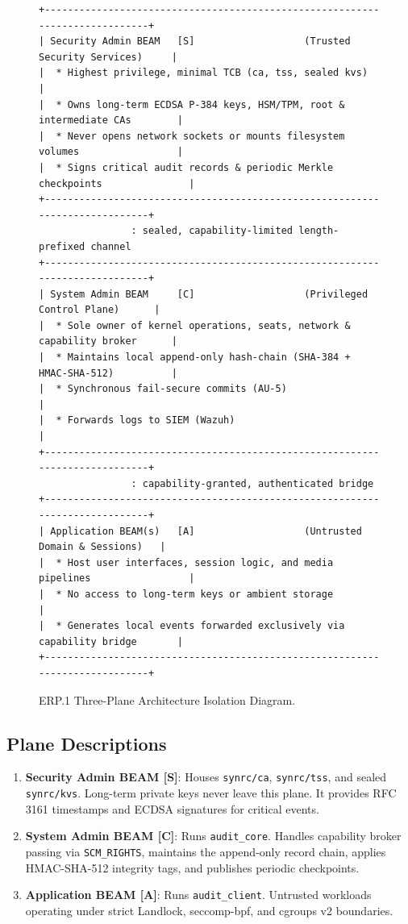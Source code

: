 \documentclass{article}
\begin{document}
\begin{figure}[h!]
\centering
\begin{lstlisting}
+-----------------------------------------------------------------------------+
| Security Admin BEAM   [S]                   (Trusted Security Services)     |
|  * Highest privilege, minimal TCB (ca, tss, sealed kvs)                     |
|  * Owns long-term ECDSA P-384 keys, HSM/TPM, root & intermediate CAs        |
|  * Never opens network sockets or mounts filesystem volumes                 |
|  * Signs critical audit records & periodic Merkle checkpoints               |
+-----------------------------------------------------------------------------+
                : sealed, capability-limited length-prefixed channel
+-----------------------------------------------------------------------------+
| System Admin BEAM     [C]                   (Privileged Control Plane)      |
|  * Sole owner of kernel operations, seats, network & capability broker      |
|  * Maintains local append-only hash-chain (SHA-384 + HMAC-SHA-512)          |
|  * Synchronous fail-secure commits (AU-5)                                   |
|  * Forwards logs to SIEM (Wazuh)                                            |
+-----------------------------------------------------------------------------+
                : capability-granted, authenticated bridge
+-----------------------------------------------------------------------------+
| Application BEAM(s)   [A]                   (Untrusted Domain & Sessions)   |
|  * Host user interfaces, session logic, and media pipelines                 |
|  * No access to long-term keys or ambient storage                           |
|  * Generates local events forwarded exclusively via capability bridge       |
+-----------------------------------------------------------------------------+
\end{lstlisting}
\caption{ERP.1 Three-Plane Architecture Isolation Diagram.}
\end{figure}

\subsection{Plane Descriptions}
\begin{enumerate}
    \item \textbf{Security Admin BEAM [S]}: Houses \texttt{synrc/ca}, \texttt{synrc/tss}, and sealed \texttt{synrc/kvs}. Long-term private keys never leave this plane. It provides RFC 3161 timestamps and ECDSA signatures for critical events.
    \item \textbf{System Admin BEAM [C]}: Runs \texttt{audit\_core}. Handles capability broker passing via \texttt{SCM\_RIGHTS}, maintains the append-only record chain, applies HMAC-SHA-512 integrity tags, and publishes periodic checkpoints.
    \item \textbf{Application BEAM [A]}: Runs \texttt{audit\_client}. Untrusted workloads operating under strict Landlock, seccomp-bpf, and cgroups v2 boundaries.
\end{enumerate}
\end{document}
